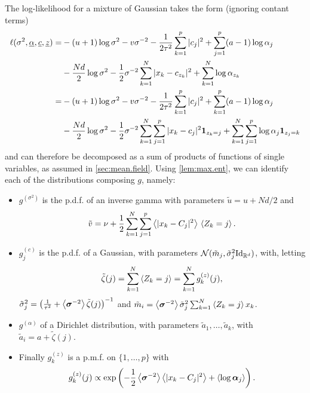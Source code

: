 The log-likelihood for a mixture of Gaussian takes the form (ignoring contant terms)
\begin{align*}
\ell(\sigma^2, \underline \alpha, \underline c, \underline z ) =& 
  -(u+1) \log \sigma^2 - v\sigma^{-2}  
- \frac1{2\tau^2} \sum_{k=1}^p |c_j|^2 + \sum_{j=1}^p (a-1)\log \alpha_j  \\ 
&- \frac{Nd}{2} \log \sigma^2
- \frac12 \sigma^{-2}  \sum_{k=1}^N |x_k-c_{z_k}|^2  + \sum_{k=1}^N \log\alpha_{z_k}\\
= & -(u+1) \log \sigma^2 - v\sigma^{-2} - \frac1{2\tau^2} \sum_{k=1}^p |c_j|^2 + \sum_{k=1}^p (a-1)\log \alpha_j  \\ 
&- \frac{Nd}{2} \log \sigma^2
- \frac12 \sigma^{-2}  \sum_{k=1}^N \sum_{j=1}^p |x_k-c_{j}|^2 {\bm 1}_{z_k=j}  + \sum_{k=1}^N \sum_{j=1}^p \log\alpha_{j} {\bm 1}_{z_j=k}
\end{align*}
and can therefore be decomposed as  a sum of products of functions of single variables, as assumed in \cref{sec:mean.field}. Using \cref{lem:max.ent}, we can identify each of the distributions composing $g$, namely:
\begin{itemize}
\item $g^{(\sigma^2)}$ is the p.d.f. of an inverse gamma with parameters $\tilde u = u+Nd/2$ and
\[
\tilde v = \nu + \frac12   \sum_{k=1}^N \sum_{j=1}^p \left\langle|x_k-C_j|^2\right\rangle\, \left\langle Z_k=j\right\rangle.
\]
\item  $g_j^{(c)}$ is the p.d.f. of a Gaussian, with parameters  $\CN(\tilde m_j, \tilde \sigma_j^2\Id[d])$, with, letting
\[
\tilde \zeta(j) = \sum_{k=1}^N \left\langle Z_k=j\right\rangle = \sum_{k=1}^N g^{(z)}_k(j),
\]
$\tilde \sigma^2_j =  \left(\frac1{\tau^2} + \left\langle\bm\sigma^{-2}\right\rangle \tilde\zeta(j) \right)^{-1}$ and
$\tilde m_i = \left\langle\bm\sigma^{-2}\right\rangle \tilde \sigma^2_j  \sum_{k=1}^N \left\langle Z_k=j\right\rangle x_k$.
\item 
 $g^{(\alpha)}$ of a Dirichlet distribution, with parameters $\tilde a_1, \ldots, \tilde a_k$, with $\tilde a_i = a + \tilde \zeta(j) $.
 \item Finally $g_k^{(z)}$ is a p.m.f. on $\{1, \ldots, p\}$ with
 \[
 g_k^{(z)}(j) \propto \exp\left(- \frac12 \left\langle\bm\sigma^{-2}\right\rangle \left\langle|x_k-C_j|^2\right\rangle +\left\langle\log \bm\alpha_j\right\rangle\right).
\]
\end{itemize}

